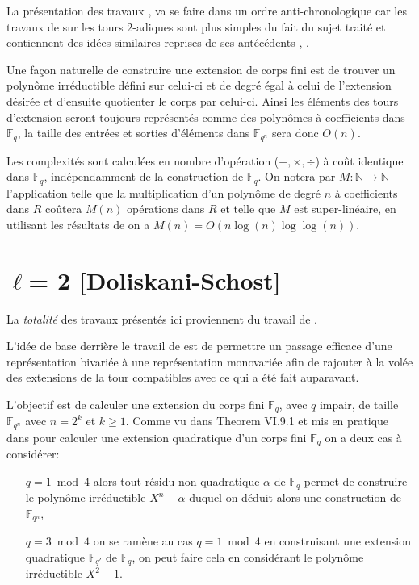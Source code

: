 \documentclass[10pt,a4paper]{book}
\theoremstyle{plain}
\theoremstyle{definition}
\theoremstyle{definition}
\theoremstyle{definition}
\theoremstyle{definition}
\theoremstyle{remark}
\theoremstyle{remark}
\begin{document}
La présentation des travaux \cite{Doliskani-Schost15}, \cite{DeFeo-Doliskani-Schost13} va se faire dans un ordre anti-chronologique car les travaux de \cite{Doliskani-Schost15} sur les tours $2$-adiques sont plus simples du fait du sujet traité et contiennent des idées similaires reprises de ses antécédents \cite{DeFeo-Doliskani-Schost13}, \cite{DeFeo-Shost'12}.

Une façon naturelle de  construire une extension de corps fini est de trouver un polynôme irréductible défini sur celui-ci et de degré égal à celui de l'extension désirée et d'ensuite quotienter le corps par celui-ci.
Ainsi les éléments des tours d'extension seront toujours représentés comme des polynômes à coefficients dans $\mathbb{F}_q$, la taille des entrées et sorties d'éléments dans $\mathbb{F}_{q^n}$ sera donc $O(n)$.

Les complexités sont calculées en nombre d'opération ($+, \times,\div$) à coût identique dans $\mathbb{F}_q$, indépendamment de la construction de $\mathbb{F}_q$. On notera par $M: \mathbb{N} \rightarrow \mathbb{N}$ l'application telle que la multiplication d'un polynôme de degré $n$ à coefficients dans $R$ coûtera $M(n)$ opérations dans $R$ et telle que $M$ est super-linéaire, en utilisant les résultats de \cite{Cantor-Kaltofen91} on a $M(n)=O(n\log(n) \log \log(n))$.

\section{$\ell$= 2 [Doliskani-Schost]}
La \emph{totalité} des travaux présentés ici proviennent du travail de \cite{Doliskani-Schost15}.

L'idée de base derrière le travail de \cite{Doliskani-Schost15} est de permettre un passage efficace d'une représentation bivariée à une représentation monovariée afin de rajouter à la volée des extensions de la tour compatibles avec ce qui a été fait auparavant.


L'objectif est de calculer une extension du corps fini $\mathbb{F}_q$, avec $q$ impair, de taille $\mathbb{F}_{q^n}$ avec $n=2^k$ et $k \geqslant 1$. 
Comme vu dans \cite{lang2002algebra}{Theorem VI.9.1} et mis en pratique dans \cite{Shoup93} pour calculer une extension quadratique d'un corps fini $\mathbb{F}_q$ on a deux cas à considérer:
\begin{itemize}
\item[$q=1 \bmod 4$] alors tout résidu non quadratique $\alpha$ de $\mathbb{F}_q$ permet de construire le polynôme irréductible $X^n-\alpha$ duquel on déduit alors une construction de $\mathbb{F}_{q^n}$,
\item[$q=3 \bmod 4$] on se ramène au cas $q=1\bmod 4$ en construisant une extension quadratique $\mathbb{F}_{q'}$ de $\mathbb{F}_q$, on peut faire cela en considérant le polynôme irréductible $X^2+1$.
\end{itemize} 
\end{document}

